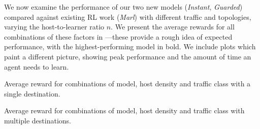 \documentclass[10pt, times, conference, letterpaper]{IEEEtran}
\begin{document}
We now examine the performance of our two new models (\emph{Instant}, \emph{Guarded}) compared against existing RL work (\emph{Marl}) with different traffic and topologies, varying the host-to-learner ratio $n$.
We present the average rewards for all combinations of these factors in ---these provide a rough idea of expected performance, with the highest-performing model in bold.
We include plots which paint a different picture, showing peak performance and the amount of time an agent needs to learn.

\begin{table}
	\centering
	\caption{Average reward for combinations of model, host density and traffic class with a single destination.\label{tab:av-vals}}
	
\vspace{-1em}
\end{table}
\begin{table}
	\centering
	\caption{Average reward for combinations of model, host density and traffic class with multiple destinations.\label{tab:av-ecmp-vals}}
	
\vspace{-1em}
\end{table}
\end{document}
